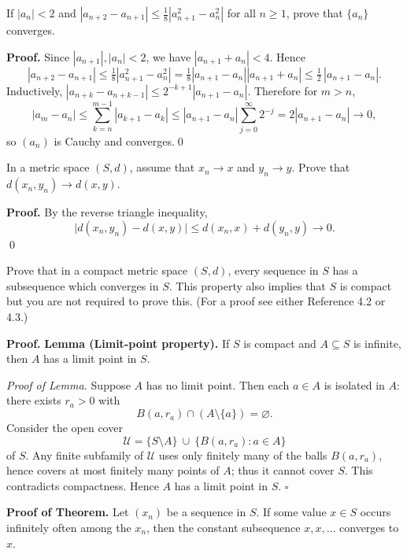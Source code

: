 \begin{problembox}
If $|a_n| < 2$ and $|a_{n+2} - a_{n+1}| \leq \frac{1}{8} |a_{n+1}^2 - a_n^2|$ for all $n \geq 1$, prove that $\{a_n\}$ converges.
\end{problembox}

\noindent\textbf{Proof.}
Since $|a_{n+1}|,|a_n|<2$, we have $|a_{n+1}+a_n|<4$. Hence
\[
|a_{n+2}-a_{n+1}|\le\tfrac18|a_{n+1}^2-a_n^2|=\tfrac18|a_{n+1}-a_n||a_{n+1}+a_n|
\le \tfrac12\,|a_{n+1}-a_n|.
\]
Inductively, $|a_{n+k}-a_{n+k-1}|\le 2^{-k+1}|a_{n+1}-a_n|$. Therefore for $m>n$,
\[
|a_m-a_n|\le \sum_{k=n}^{m-1}|a_{k+1}-a_k|\le |a_{n+1}-a_n|\sum_{j=0}^{\infty}2^{-j}=2|a_{n+1}-a_n|\to 0,
\]
so $(a_n)$ is Cauchy and converges.\qed
\medskip



\begin{problembox}
In a metric space $(S, d)$, assume that $x_n \to x$ and $y_n \to y$. Prove that $d(x_n, y_n) \to d(x, y)$.
\end{problembox}

\noindent\textbf{Proof.}
By the reverse triangle inequality,
\[
\big|d(x_n,y_n)-d(x,y)\big|\le d(x_n,x)+d(y_n,y)\to 0.
\]\qed
\medskip



\begin{problembox}
Prove that in a compact metric space $(S, d)$, every sequence in $S$ has a subsequence which converges in $S$. This property also implies that $S$ is compact but you are not required to prove this. (For a proof see either Reference 4.2 or 4.3.)
\end{problembox}

\noindent\textbf{Proof.}
\textbf{Lemma (Limit-point property).}
If \(S\) is compact and \(A\subseteq S\) is infinite, then \(A\) has a limit point in \(S\).

\emph{Proof of Lemma.}
Suppose \(A\) has no limit point. Then each \(a\in A\) is isolated in \(A\): there exists \(r_a>0\) with
\[
B(a,r_a)\cap (A\setminus\{a\})=\varnothing.
\]
Consider the open cover
\[
\mathcal{U}=\{S\setminus A\}\ \cup\ \{B(a,r_a):a\in A\}
\]
of \(S\). Any finite subfamily of \(\mathcal{U}\) uses only finitely many of the balls \(B(a,r_a)\), hence covers at most finitely many points of \(A\); thus it cannot cover \(S\). This contradicts compactness. Hence \(A\) has a limit point in \(S\). \(\square\)

\textbf{Proof of Theorem.}
Let \((x_n)\) be a sequence in \(S\).
If some value \(x\in S\) occurs infinitely often among the \(x_n\), then the constant subsequence \(x,x,\dots\) converges to \(x\).


